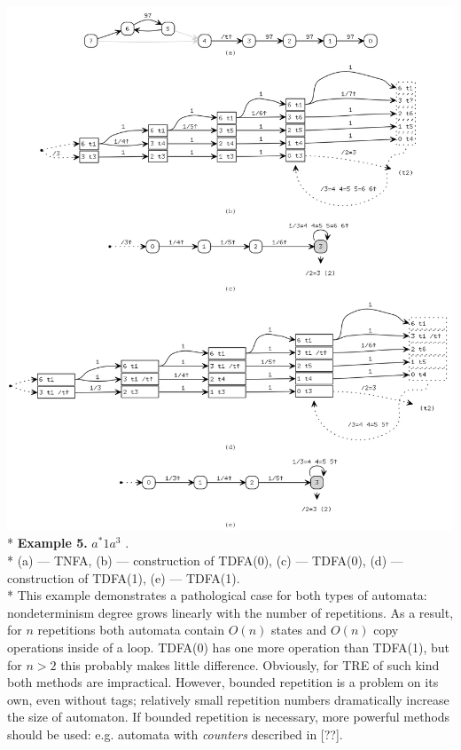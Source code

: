 \documentclass{article}
\newenvironment{Xfig}
    {\par\medskip\noindent\minipage{\linewidth}\begin{center}}
    {\end{center}\endminipage\par\medskip}
\theoremstyle{definition}
\begin{document}
\begin{Xfig}
\includegraphics[width=0.9\linewidth]{img/example3/all.png}\\*
\textbf{Example 5.} $a^* 1 a^{3}$ .\\*
(a) --- TNFA, (b) --- construction of TDFA(0), (c) --- TDFA(0), (d) --- construction of TDFA(1), (e) --- TDFA(1).\\*
This example demonstrates a pathological case for both types of automata:
nondeterminism degree grows linearly with the number of repetitions.
As a result, for $n$ repetitions both automata contain $O(n)$ states and $O(n)$ copy operations inside of a loop.
TDFA(0) has one more operation than TDFA(1), but for $n \!>\! 2$ this probably makes little difference.
Obviously, for TRE of such kind both methods are impractical.
However, bounded repetition is a problem on its own, even without tags;
relatively small repetition numbers dramatically increase the size of automaton.
If bounded repetition is necessary, more powerful methods should be used:
e.g. automata with \emph{counters} described in [??].
\end{Xfig}
\end{document}

